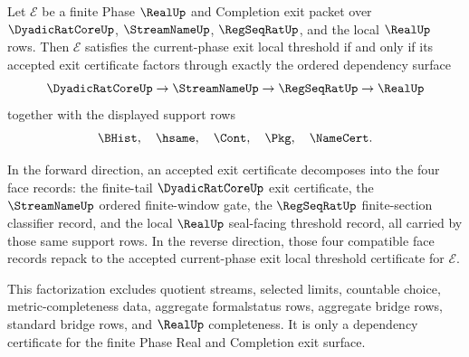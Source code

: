 \begin{theorem}
\label{thm:real-l10-exit-certificate-dependency-factorization}
Let $\mathcal E$ be a finite Phase $\RealUp$ and Completion exit packet over $\DyadicRatCoreUp$, $\StreamNameUp$, $\RegSeqRatUp$, and the local $\RealUp$ rows. Then $\mathcal E$ satisfies the current-phase exit local threshold if and only if its accepted exit certificate factors through exactly the ordered dependency surface
$$
\DyadicRatCoreUp \to \StreamNameUp \to \RegSeqRatUp \to \RealUp
$$
together with the displayed support rows
$$
\BHist,\quad \hsame,\quad \Cont,\quad \Pkg,\quad \NameCert.
$$

In the forward direction, an accepted exit certificate decomposes into the four face records: the finite-tail $\DyadicRatCoreUp$ exit certificate, the $\StreamNameUp$ ordered finite-window gate, the $\RegSeqRatUp$ finite-section classifier record, and the local $\RealUp$ seal-facing threshold record, all carried by those same support rows. In the reverse direction, those four compatible face records repack to the accepted current-phase exit local threshold certificate for $\mathcal E$.

This factorization excludes quotient streams, selected limits, countable choice, metric-completeness data, aggregate formalstatus rows, aggregate bridge rows, standard bridge rows, and $\RealUp$ completeness. It is only a dependency certificate for the finite Phase Real and Completion exit surface.
\end{theorem}
